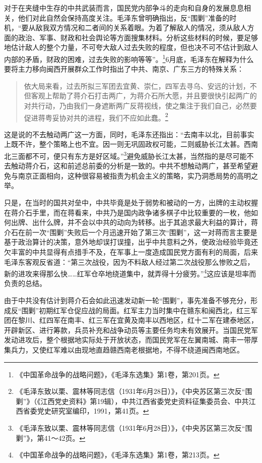 对于在夹缝中生存的中共武装而言，国民党内部争斗的走向和自身的发展息息相关，他们对此自然会保持高度关注。毛泽东曾明确指出，反“围剿”准备的时机，“要从敌我双方情况和二者间的关系着眼。为着了解敌人的情况，须从敌人方面的政治、军事、财政和社会舆论等方面搜集材料。分析这些材料的时候，要足够地估计敌人的整个力量，不可夸大敌人过去失败的程度，但也决不可不估计到敌人内部的矛盾，财政的困难，过去失败的影响等等”。\footnote{《中国革命战争的战略问题》，《毛泽东选集》第1卷，第201页。}6月底，毛泽东在解释为什么要将主力移向闽西开展群众工作时指出了中共、南京、广东三方的特殊关系：

\begin{quote}

依大局来看，过去所拟三军团去宜黄、崇仁，四军去寻乌、安远的计划，不但客观上帮助了蒋介石打击两广，为蒋介石所大愿，并且要很快引起两广的对共行动，乃由我们一身遮断两广反蒋视线，使之集注于我们自己，必然要促进蒋粤妥协对共的进程，我们不应如此蠢。\footnote{《毛泽东致以栗、震林等同志信（1931年6月28日）》，《中央苏区第三次反“围剿”》（《江西党史资料》第19辑），中共江西省委党史资料征集委员会、中共江西省委党史研究室编印，1991，第41页。}
\end{quote}


这是说的不去触动两广这一方面，同时，毛泽东还指出：“去南丰以北，目前事实上既不许，整个策略上也不宜。因一则无巩固政权可能，二则威胁长江太甚。西南北三面都不可，便只有东方是好区域。”\footnote{《毛泽东致以栗、震林等同志信（1931年6月28日）》，《中央苏区第三次反“围剿”》，第41～42页。}避免威胁长江太甚，当然指的是尽可能不去触动蒋介石，这和前述总前委的分析是一致的。中共不想触动两广，甚至希望避免与南京正面相向，这种很容易被指责为机会主义的策略，实乃洞悉局势的高明之举。


只是，在当时的国共对垒中，中共毕竟是处于弱势和被动的一方，出牌的主动权握在蒋介石手里，而在蒋看来，中共乃是国内政争诸多棋子中比较重要的一枚，他如何出牌、出什么牌，并不会以中共的动向为转移。出于其追求最大利益的算计，蒋介石在前一次“围剿”失败后一个月迅速开始了第三次“围剿”，这一对蒋而言主要是基于政治算计的决策，意外地却误打误撞，出乎中共意料之外，使政治经验毕竟还欠丰富的中共显得有点措手不及，在军事上一度造成国民党方面有利的局面，后来毛泽东客观反省道：“第三次战役，因为不料敌人经过第二次战役那么惨败之后，新的进攻来得那么快……红军仓卒地绕道集中，就弄得十分疲劳。”\footnote{《中国革命战争的战略问题》，《毛泽东选集》第1卷，第213页。}这应该是坦率而负责的总结。


由于中共没有估计到蒋介石会如此迅速发动新一轮“围剿”，事先准备不够充分，形成反“围剿”初期红军仓促应战的局面。红军主力当时集中在赣东和闽西北，红三军团在黎川、红四军在南丰、红三军在宜黄及南丰以西地区，红十二军在建泰地区，开辟新区、进行筹款，兵员补充和战争动员等主要任务均未有效展开。当国民党军发动进攻后，整个根据地实际处于开放状态，而国民党军在左翼南城、南丰一带厚集兵力，又使红军难以由现地直趋赣西南老根据地，不得不绕道闽西南地区。


